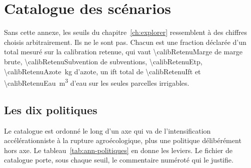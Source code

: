 \chapter{Catalogue des scénarios}
\label{ann:scenarios}

Sans cette annexe, les seuils du chapitre~\ref{ch:explorer} ressemblent à des chiffres choisis
arbitrairement. Ils ne le sont pas. Chacun est une fraction déclarée d'un total mesuré sur la
calibration retenue, qui vaut \SI{\calibRetenuMarge}{\euros} de marge brute,
\SI{\calibRetenuSubvention}{\euros} de subventions, \SI{\calibRetenuEtp}{\etp},
\SI{\calibRetenuAzote}{\kilogram} d'azote, un \gls{ift} total de \num{\calibRetenuIft} et
\SI{\calibRetenuEau}{\metre\cubed} d'eau sur les seules parcelles irrigables.

\section{Les dix politiques}

Le catalogue est ordonné le long d'un axe qui va de l'intensification accélérationniste à la
rupture agroécologique, plus une politique délibérément hors axe. Le
tableau~\ref{tab:ann-politiques} en donne les leviers. Le fichier de catalogue porte, sous
chaque seuil, le commentaire numéroté qui le justifie.

